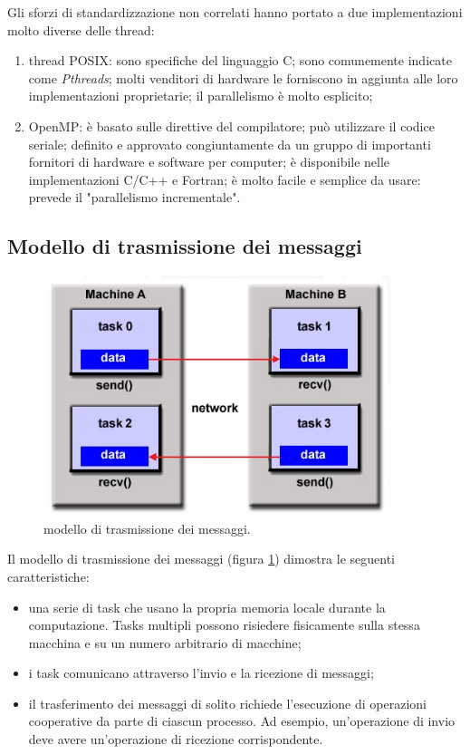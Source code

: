 Gli sforzi di standardizzazione non correlati hanno portato a due implementazioni molto diverse delle thread:
\begin{enumerate}
	\item thread POSIX: sono specifiche del linguaggio C; sono comunemente indicate come \textit{Pthreads}; molti venditori di hardware le forniscono in aggiunta alle loro implementazioni proprietarie; il parallelismo è molto esplicito;
	\item OpenMP: è basato sulle direttive del compilatore; può utilizzare il codice seriale; definito e approvato congiuntamente da un gruppo di importanti fornitori di hardware e software per computer; è disponibile nelle implementazioni C/C++ e Fortran; è molto facile e semplice da usare: prevede il "parallelismo incrementale".
\end{enumerate}
\subsection{Modello di trasmissione dei messaggi}
\begin{figure}[th]
	\centering
	\includegraphics[width=0.7\linewidth]{img/modello-trasmissione-messaggi}
	\caption{modello di trasmissione dei messaggi.}
	\label{fig:modello-trasmissione-messaggi}
\end{figure}
Il modello di trasmissione dei messaggi (figura \ref{fig:modello-trasmissione-messaggi}) dimostra le seguenti caratteristiche:
\begin{itemize}
	\item una serie di task che usano la propria memoria locale durante la computazione. Tasks multipli possono risiedere fisicamente sulla stessa macchina e su un numero arbitrario di macchine;
	\item i task comunicano attraverso l'invio e la ricezione di messaggi;
	\item il trasferimento dei messaggi di solito richiede l'esecuzione di operazioni cooperative da parte di ciascun processo. Ad esempio, un'operazione di invio deve avere un'operazione di ricezione corrispondente.
\end{itemize}

